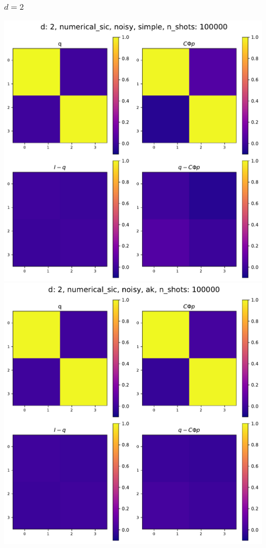 \documentclass{beamer}
\begin{document}
\begin{frame}
\frametitle{$d=2$}
\begin{center}
\includegraphics[scale=0.25]{img/q_d2_numerical_sic_noisy_simple_n100000}\includegraphics[scale=0.25]{img/q_d2_numerical_sic_noisy_ak_n100000}		
\end{center}
\end{frame}
\end{document}
